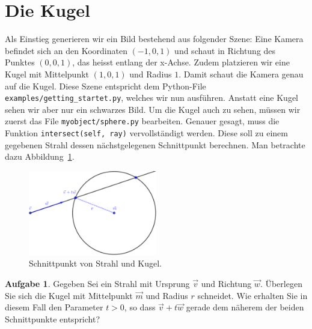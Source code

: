 \documentclass[12pt,a4paper]{article}
\theoremstyle{definition}
\newtheorem{aufgabe}{Aufgabe}
\theoremstyle{definition}
\begin{document}
	\section*{Die Kugel}
	Als Einstieg generieren wir ein Bild bestehend aus folgender Szene:
	Eine Kamera befindet sich an den Koordinaten $(-1,0,1)$ und schaut in Richtung des Punktes $(0,0,1)$, das heisst entlang der x-Achse.
	Zudem platzieren wir eine Kugel mit Mittelpunkt $(1,0,1)$ und Radius $1$.
	Damit schaut die Kamera genau auf die Kugel.
	Diese Szene entspricht dem Python-File \texttt{examples/getting\_startet.py}, welches wir nun ausführen. Anstatt eine Kugel sehen wir aber nur ein schwarzes Bild.
	Um die Kugel auch zu sehen, müssen wir zuerst das File \texttt{myobject/sphere.py} bearbeiten.
	Genauer gesagt, muss die Funktion \texttt{intersect(self, ray)} vervollständigt werden.
	Diese soll zu einem gegebenen Strahl dessen nächstgelegenen Schnittpunkt berechnen.
	Man betrachte dazu Abbildung~\ref{fig:sphere_intersect}.
	\begin{figure}[ht]
		\centering
		\includegraphics[width=0.5\textwidth]{images/sphere_intersect.pdf}
		\caption{Schnittpunkt von Strahl und Kugel.}
		\label{fig:sphere_intersect}
	\end{figure}
	\begin{aufgabe}\label{aufg:intersect_theory}
		Gegeben Sei ein Strahl mit Ursprung $\vec{v}$ und Richtung $\vec{w}$.
		Überlegen Sie sich die Kugel mit Mittelpunkt $\vec{m}$ und Radius $r$ schneidet.
		Wie erhalten Sie in diesem Fall den Parameter $t>0$, so dass $\vec{v}+t\vec{w}$ gerade dem näherem der beiden Schnittpunkte entspricht?
	\end{aufgabe}
\end{document}
